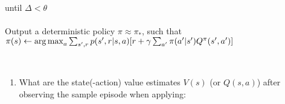 \documentclass{exam}
\begin{document}
\begin{problem}
\begin{enumerate}
\begin{solutionorlines}[2in]
\begin{itemize}
\begin{itemize}
        \end{itemize}
    \end{itemize}
    until $\Delta < \theta$\\
    \\
    Output a deterministic policy $\pi \approx \pi_*$, such that\\
    $\pi(s) \leftarrow \operatorname*{arg\,max}_a \sum_{s', r} p(s', r| s, a) [r + \gamma \sum_{a'} \pi(a'|s') Q^{\pi}(s', a')]$
    \end{solutionorlines}
\end{enumerate}

\end{problem}

\begin{problem}
\ \newline
\begin{enumerate}
    \item 
    What are the state(-action) value estimates $V(s)$ (or $Q(s,a)$) after observing the sample episode when applying:
    

\end{enumerate}
\end{problem}
\end{document}
